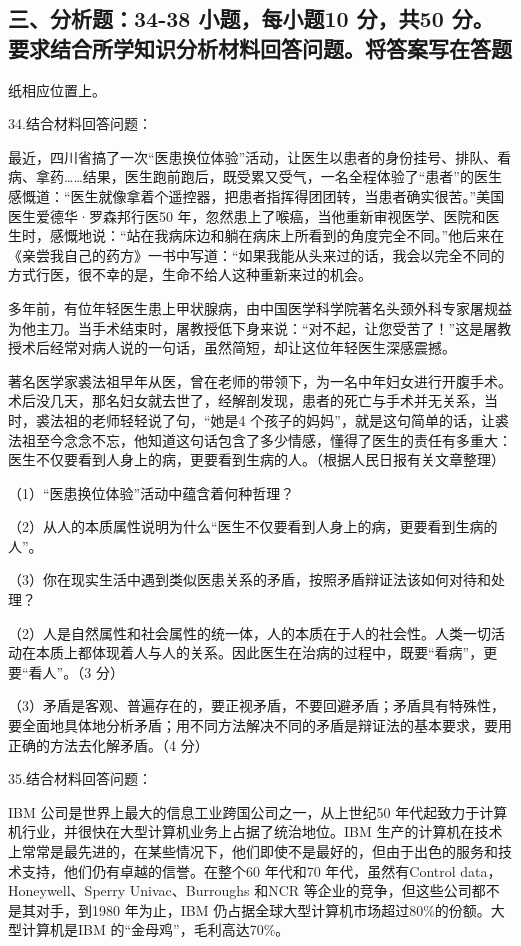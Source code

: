 \documentclass[UTF8,11pt]{ctexart}
\begin{document}
\subsection*{三、分析题：34-38 小题，每小题10 分，共50 分。要求结合所学知识分析材料回答问题。将答案写在答题}

纸相应位置上。


34.结合材料回答问题：

最近，四川省搞了一次“医患换位体验”活动，让医生以患者的身份挂号、排队、看病、拿药……结果，医生跑前跑后，既受累又受气，一名全程体验了“患者”的医生感慨道：“医生就像拿着个遥控器，把患者指挥得团团转，当患者确实很苦。”美国医生爱德华·罗森邦行医50 年，忽然患上了喉癌，当他重新审视医学、医院和医生时，感慨地说：“站在我病床边和躺在病床上所看到的角度完全不同。”他后来在《亲尝我自己的药方》一书中写道：“如果我能从头来过的话，我会以完全不同的方式行医，很不幸的是，生命不给人这种重新来过的机会。

多年前，有位年轻医生患上甲状腺病，由中国医学科学院著名头颈外科专家屠规益为他主刀。当手术结束时，屠教授低下身来说：“对不起，让您受苦了！”这是屠教授术后经常对病人说的一句话，虽然简短，却让这位年轻医生深感震撼。

著名医学家裘法祖早年从医，曾在老师的带领下，为一名中年妇女进行开腹手术。术后没几天，那名妇女就去世了，经解剖发现，患者的死亡与手术并无关系，当时，裘法祖的老师轻轻说了句，“她是4 个孩子的妈妈”，就是这句简单的话，让裘法祖至今念念不忘，他知道这句话包含了多少情感，懂得了医生的责任有多重大：医生不仅要看到人身上的病，更要看到生病的人。（根据人民日报有关文章整理）

（1）“医患换位体验”活动中蕴含着何种哲理？


（2）从人的本质属性说明为什么“医生不仅要看到人身上的病，更要看到生病的人”。


（3）你在现实生活中遇到类似医患关系的矛盾，按照矛盾辩证法该如何对待和处理？


（2）人是自然属性和社会属性的统一体，人的本质在于人的社会性。人类一切活动在本质上都体现着人与人的关系。因此医生在治病的过程中，既要“看病”，更要“看人”。（3 分）


（3）矛盾是客观、普遍存在的，要正视矛盾，不要回避矛盾；矛盾具有特殊性，要全面地具体地分析矛盾；用不同方法解决不同的矛盾是辩证法的基本要求，要用正确的方法去化解矛盾。（4 分）


35.结合材料回答问题：

IBM 公司是世界上最大的信息工业跨国公司之一，从上世纪50 年代起致力于计算机行业，并很快在大型计算机业务上占据了统治地位。IBM 生产的计算机在技术上常常是最先进的，在某些情况下，他们即使不是最好的，但由于出色的服务和技术支持，他们仍有卓越的信誉。在整个60 年代和70 年代，虽然有Control data，Honeywell、Sperry Univac、Burroughs 和NCR 等企业的竞争，但这些公司都不是其对手，到1980 年为止，IBM 仍占据全球大型计算机市场超过80\%的份额。大型计算机是IBM 的“金母鸡”，毛利高达70\%。
\end{document}
